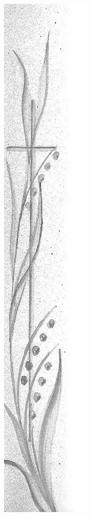 \documentclass[ngerman,a4paper,11pt]{scrreprt}
\begin{document}
\begin{figure}[H]
\centering
\includegraphics[width=\textwidth,height=.8\textheight]{Bilder/Bilder/./750_0010_15447_kreuz_pflanze.png}
\end{figure}
\end{document}
